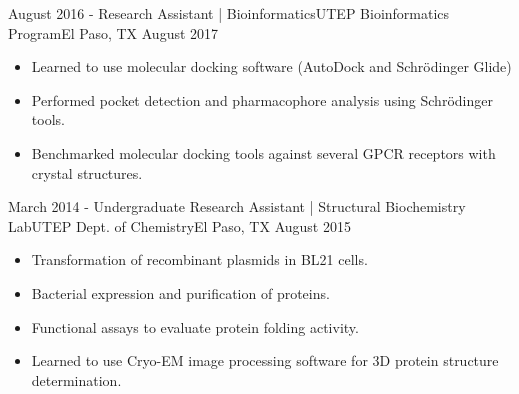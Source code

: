 \begin{experiences}
  \emptySeparator

  \experience
    {August 2016 -} {Research Assistant | Bioinformatics}{UTEP Bioinformatics Program}{El Paso, TX}
    {August 2017} {
        \begin{itemize}
        \item Learned to use molecular docking software (AutoDock and Schrödinger Glide)
        \item Performed pocket detection and pharmacophore analysis using Schrödinger tools.
        \item Benchmarked molecular docking tools against several GPCR receptors with crystal structures.
        \end{itemize}
    }

  \emptySeparator

    \experience
    {March 2014 -} {Undergraduate Research Assistant | Structural Biochemistry Lab}{UTEP Dept. of Chemistry}{El Paso, TX}
    {August 2015} {
        \begin{itemize}
        \item Transformation of recombinant plasmids in BL21 cells.
        \item Bacterial expression and purification of proteins.
        \item Functional assays to evaluate protein folding activity.
        \item Learned to use Cryo-EM image processing software for 3D protein structure determination.
        \end{itemize}
    }


\end{experiences}
